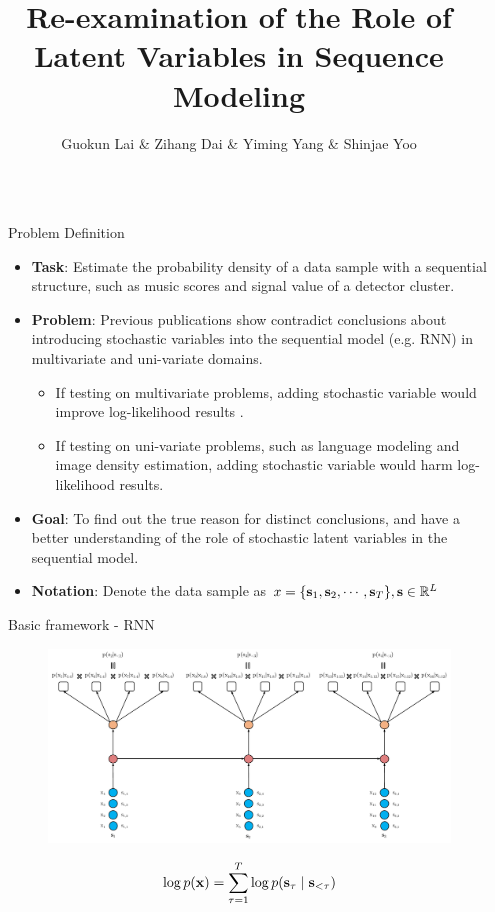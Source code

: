 \documentclass[final]{beamer}
\title{Re-examination of the Role of Latent Variables in Sequence Modeling}
\author{Guokun Lai \inst{1} \& Zihang Dai \inst{1} \& Yiming Yang \inst{1} \& Shinjae Yoo \inst{2}}
\institute[shortinst]{\inst{1} Carnegie Mellon University \samelineand \inst{2} Brookhaven National Laboratory}
\newlength{\sepwidth}
\newlength{\colwidth}
\newcommand{\separatorcolumn}{\begin{column}{\sepwidth}\end{column}}
\begin{document}
\begin{frame}[t]
\begin{columns}[t]
\separatorcolumn

\begin{column}{\colwidth}

  \begin{block}{Problem Definition}

	    \begin{itemize}
		\item \textbf{Task}: Estimate the probability density of a data sample with a sequential structure, such as music scores and signal value of a detector cluster. 
		\item \textbf{Problem}: Previous publications show contradict conclusions about introducing stochastic variables into the sequential model (e.g. RNN) in multivariate and uni-variate domains. 
	    \begin{itemize}
			\item If testing on multivariate problems, adding stochastic variable would improve log-likelihood results \cite{chung2015recurrent,fraccaro2016sequential,goyal2017z}.
			\item If testing on uni-variate problems, such as language modeling and image density estimation, adding stochastic variable would harm log-likelihood results.
		\end{itemize} 
		\item \textbf{Goal}: To find out the true reason for distinct conclusions, and have a better understanding of the role of stochastic latent variables in the sequential model. 
		\item \textbf{Notation}: Denote the data sample as $x = \{{\mathbf{s}}_1, {\mathbf{s}}_2, \cdots, {\mathbf{s}}_T\}, {\mathbf{s}} \in \mathbb{R}^L $
		\end{itemize}
		\vspace{-1em}
  \end{block}

  \begin{block}{Basic framework - RNN}
	\begin{figure}
		\includegraphics[width=0.9\linewidth]{fig/RNN-L4.pdf}
	\end{figure}
	\vspace{-1em}
	\begin{align*}
	\log p({\mathbf{x}}) 
	= \sum_{\tau=1}^{T} \log p({\mathbf{s}}_{\tau} \mid {\mathbf{s}}_{<\tau})
	\end{align*}
	\vspace{-1em}
  \end{block}


\end{column}
\end{columns}
\end{frame}
\end{document}
